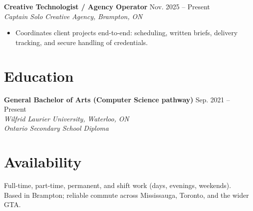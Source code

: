 \documentclass[a4paper,10pt]{article}
\begin{document}
\vspace{3pt}
\textbf{Creative Technologist / Agency Operator} \hfill Nov. 2025 -- Present \\
\textit{Captain Solo Creative Agency, Brampton, ON}
\begin{itemize}
    \item Coordinates client projects end-to-end: scheduling, written briefs, delivery tracking, and secure handling of credentials.
\end{itemize}

\section*{Education}
\textbf{General Bachelor of Arts (Computer Science pathway)} \hfill Sep. 2021 -- Present \\
\textit{Wilfrid Laurier University, Waterloo, ON} \\
\textit{Ontario Secondary School Diploma}

\section*{Availability}
Full-time, part-time, permanent, and shift work (days, evenings, weekends). Based in Brampton; reliable commute across Mississauga, Toronto, and the wider GTA.
\end{document}
